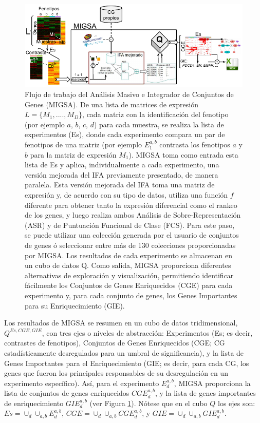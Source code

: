\documentclass[12pt,twoside]{reedthesis}
\begin{document}
\begin{figure}

{\centering \includegraphics[width=1\linewidth]{images/MIGSA_FIG1_es} 

}

\caption{Flujo de trabajo del Análisis Masivo e Integrador de Conjuntos de Genes (MIGSA). De una lista de matrices de expresión \(L=\{M_1,....,M_D\}\), cada matriz con la identificación del fenotipo (por ejemplo \(a\), \(b\), \(c\), \(d\)) para cada muestra, se realiza la lista de experimentos (Es), donde cada experimento compara un par de fenotipos de una matriz (por ejemplo \(E_{1}^{a,b}\) contrasta los fenotipos \(a\) y \(b\) para la matriz de expresión \(M_1\)). MIGSA toma como entrada esta lista de Es y aplica, individualmente a cada experimento, una versión mejorada del IFA previamente presentado, de manera paralela. Esta versión mejorada del IFA toma una matriz de expresión y, de acuerdo con su tipo de datos, utiliza una función \(f\) diferente para obtener tanto la expresión diferencial como el rankeo de los genes, y luego realiza ambos Análisis de Sobre-Representación (ASR) y de Puntuación Funcional de Clase (FCS). Para este paso, se puede utilizar una colección generada por el usuario de conjuntos de genes ó seleccionar entre más de 130 colecciones proporcionadas por MIGSA. Los resultados de cada experimento se almacenan en un cubo de datos Q. Como salida, MIGSA proporciona diferentes alternativas de exploración y visualización, permitiendo identificar fácilmente los Conjuntos de Genes Enriquecidos (CGE) para cada experimento y, para cada conjunto de genes, los Genes Importantes para su Enriquecimiento (GIE).}\label{fig:migsa1}
\end{figure}


\par

Los resultados de MIGSA se resumen en un cubo de datos tridimensional, \(Q^{Es,CGE,GIE}\), con tres ejes o niveles de abstracción: Experimentos (Es; es decir, contrastes de fenotipos), Conjuntos de Genes Enriquecidos (CGE; CG estadísticamente desregulados para un umbral de significancia), y la lista de Genes Importantes para el Enriquecimiento (GIE; es decir, para cada CG, los genes que fueron los principales responsables de su desregulación en un experimento específico). Así, para el experimento \(E_{d}^{a,b}\), MIGSA proporciona la lista de conjuntos de genes enriquecidos \(CGE_{d}^{a,b}\), y la lista de genes importantes de enriquecimiento \(GIE_{d}^{a,b}\) (ver Figura \ref{fig:migsa1}). Nótese que en el cubo \(Q\) los ejes son: \(Es=\cup_d\cup_{a,b}E_{d}^{a,b}\), \(CGE=\cup_d\cup_{a,b}CGE_{d}^{a,b}\), y \(GIE=\cup_d\cup_{a,b}GIE_{d}^{a,b}\).
\end{document}
